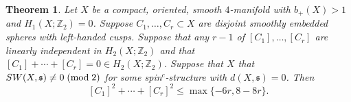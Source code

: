 \documentclass{amsart}
\newtheorem{theorem}{Theorem}[section]
\theoremstyle{definition}
\theoremstyle{remark}
\numberwithin{equation}{section}
\begin{document}
\begin{theorem}
Let $X$ be a compact, oriented, smooth $4$-manifold with $b_+(X) > 1$ and $H_1(X ; \mathbb{Z}_2) = 0$. Suppose $C_1, \dots , C_r \subset X$ are disjoint smoothly embedded spheres with left-handed cusps. Suppose that any $r-1$ of $[C_1] , \dots , [C_r]$ are linearly independent in $H_2(X ; \mathbb{Z}_2)$ and that $[C_1] + \cdots + [C_r] = 0 \in H_2(X ; \mathbb{Z}_2)$. Suppose that $X$ that $SW(X , \mathfrak{s}) \neq 0 \; ({\rm mod} \; 2)$ for some spin$^c$-structure with $d(X , \mathfrak{s}) = 0$. Then
\[
[C_1]^2 + \cdots + [C_r]^2 \le \max\{ -6r , 8-8r \}.
\]
\end{theorem}





\end{document}
